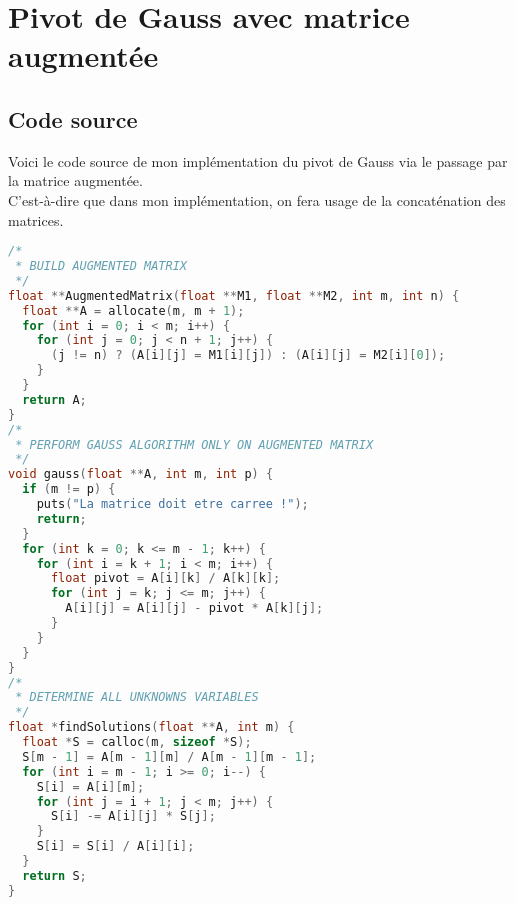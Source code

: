 \section{Pivot de Gauss avec matrice augmentée}
\subsection{Code source}
Voici le code source de mon implémentation du pivot de Gauss via le passage par la matrice augmentée.\\
C'est-à-dire que dans mon implémentation, on fera usage de la concaténation des matrices.
\begin{lstlisting}[language=C]
/*
 * BUILD AUGMENTED MATRIX
 */
float **AugmentedMatrix(float **M1, float **M2, int m, int n) {
  float **A = allocate(m, m + 1);
  for (int i = 0; i < m; i++) {
    for (int j = 0; j < n + 1; j++) {
      (j != n) ? (A[i][j] = M1[i][j]) : (A[i][j] = M2[i][0]);
    }
  }
  return A;
}
/*
 * PERFORM GAUSS ALGORITHM ONLY ON AUGMENTED MATRIX
 */
void gauss(float **A, int m, int p) {
  if (m != p) {
    puts("La matrice doit etre carree !");
    return;
  }
  for (int k = 0; k <= m - 1; k++) {
    for (int i = k + 1; i < m; i++) {
      float pivot = A[i][k] / A[k][k];
      for (int j = k; j <= m; j++) {
        A[i][j] = A[i][j] - pivot * A[k][j];
      }
    }
  }
}
/*
 * DETERMINE ALL UNKNOWNS VARIABLES
 */
float *findSolutions(float **A, int m) {
  float *S = calloc(m, sizeof *S);
  S[m - 1] = A[m - 1][m] / A[m - 1][m - 1];
  for (int i = m - 1; i >= 0; i--) {
    S[i] = A[i][m];
    for (int j = i + 1; j < m; j++) {
      S[i] -= A[i][j] * S[j];
    }
    S[i] = S[i] / A[i][i];
  }
  return S;
}
\end{lstlisting}
